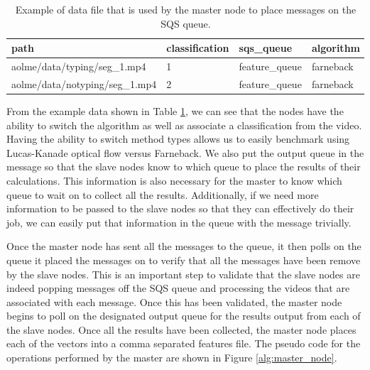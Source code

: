 \begin{table}[h]
  \begin{tabular}{ | l | l | l | p{2cm} |}
  \hline
  \textbf{path} & \textbf{classification} & \textbf{sqs\_queue} & \textbf{algorithm}\\ \hline
  aolme/data/typing/seg\_1.mp4 & 1 & feature\_queue & farneback \\ \hline
  aolme/data/notyping/seg\_1.mp4 & 2 & feature\_queue & farneback \\
  \hline
  \end{tabular}
  \caption{Example of data file that is used by the master node to place messages on
  the SQS queue. }
  \label{tab:message_queue}
\end{table}

\FloatBarrier

From the example data shown in Table \ref{tab:message_queue}, we can see that
the nodes have the ability to switch the algorithm as well as associate a
classification from the video. Having the ability to switch method types allows
us to easily benchmark using Lucas-Kanade optical flow versus Farneback.
We also put the output queue in the message so that the slave nodes know to which
queue to place the results of their calculations. This information is also necessary
for the master to know which queue to wait on to collect all the results. Additionally,
if we need more information to be passed to the slave nodes so that they can
effectively do their job, we can easily put that information in the queue with
the message trivially.

Once the master node has sent all the messages to the queue, it then polls
on the queue it placed the messages on to verify that all the messages have been
remove by the slave nodes. This is an important step to validate that the
slave nodes are indeed popping messages off the SQS queue and processing
the videos that are associated with each message. Once this has been validated,
the master node begins to poll on the designated output queue for the results output
from each of the slave nodes. Once all the results have been collected, the master
node places each of the vectors into a comma separated features file.
The pseudo code for the operations performed by the master are shown in Figure
\ref{alg:master_node}.

